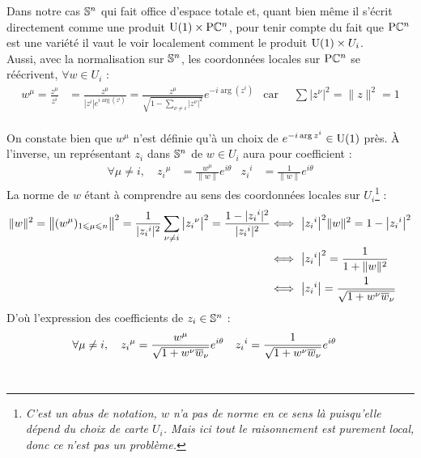 Dans notre cas $\S{n}$ qui fait office d'espace totale et, quant bien même il s'écrit directement comme une produit $\U{1}\times \PC{n}$, pour tenir compte du fait que $\PC{n}$ est une variété il vaut le voir localement comment le produit $\U{1}\times U_i$.
\\
Aussi, avec la normalisation sur $\S{n}$, les coordonnées locales sur $\PC{n}$ se réécrivent, $\forall w\in U_i$ :
\begin{align*}
	w^\mu = \frac{z^\mu}{z^i} &= \frac{z^\mu}{|z^i|e^{i\arg (z^i)}} = \frac{z^{\mu}}{\sqrt{1 - \sum_{\nu \neq i} |z^\nu|^2}} e^{-i\arg(z^i)}  &  \text{car }\quad \sum \big|z^\nu\big|^2 = \|z\|^2 = 1
\end{align*}
\\
On constate bien que $w^\mu$ n'est définie qu'à un choix de $e^{-i\arg z^i}\in \U{1}$ près. À l'inverse, un représentant $z_i$ dans $\S{n}$ de $w\in U_i$ aura pour coefficient :
\begin{align*}
	\forall \mu\neq i,\quad {z_i}^\mu &= \frac{w^\mu}{\|w\|}e^{i\theta}  &  {z_i}^i &= \frac{1}{\|w\|}e^{i\theta} 
\end{align*}
La norme de $w$ étant à comprendre au sens des coordonnées locales sur $U_i$\footnote{\itshape
	C'est un abus de notation, $w$ n'a pas de norme en ce sens là puisqu'elle dépend du choix de carte $U_i$. Mais ici tout le raisonnement est purement local, donc ce n'est pas un problème.
} :
\begin{align*}
	\|w\|^2 = \big\|(w^\mu)_{1\leq \mu\leq n}\big\|^2 = \frac{1}{|{z_i}^i|^2}\sum_{\nu \neq i} \big|{z_i}^\nu\big|^2 = \frac{1 - |{z_i}^i|^2}{|{z_i}^i|^2} &\Llr\ \big| {z_i}^i \big|^2 \|w\|^2 = 1 - \big|{z_i}^i\big|^2 \\
	&\Llr\ \big|{z_i}^i\big|^2 = \frac{1}{1 + \|w\|^2} \\
	&\Llr\ \big|{z_i}^i\big| = \frac{1}{\sqrt{1 + w^\nu \congu{w}_\nu}}
\end{align*}
D'où l'expression des coefficients de $z_i\in\S{n}$ :
\begin{align*}
	 \forall \mu\neq i,\quad {z_i}^\mu &= \frac{w^\mu}{\sqrt{1 + w^\nu \congu{w}_\nu}}e^{i\theta}  &  {z_i}^i &= \frac{1}{\sqrt{1 + w^\nu \congu{w}_\nu}}e^{i\theta} 
\end{align*}
\\

